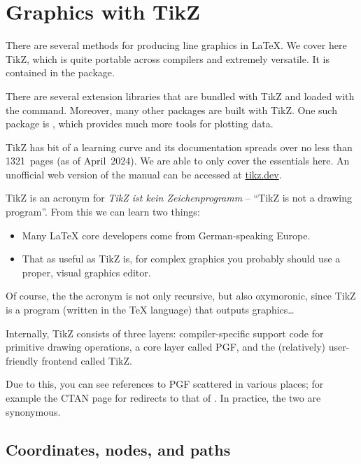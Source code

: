 \chapter{Graphics with TikZ}

There are several methods for producing line graphics in \LaTeX.
We cover here TikZ, which is quite portable across compilers and extremely versatile.
It is contained in the  package.

There are several extension libraries that are bundled with TikZ and loaded with the  command.
Moreover, many other packages are built with TikZ.
One such package is , which provides much more tools for plotting data.

TikZ has bit of a learning curve
and its documentation spreads over no less than 1321~pages (as of April~2024).
We are able to only cover the essentials here.
An unofficial web version of the manual can be accessed at \url{tikz.dev}.

\begin{technote}
TikZ is an acronym for \emph{TikZ ist kein Zeichenprogramm}
-- ``TikZ is not a drawing program''.
From this we can learn two things:
\begin{itemize}
\item Many \LaTeX{} core developers come from German-speaking Europe.
\item That as useful as TikZ is,
    for complex graphics you probably should use a proper, visual graphics editor.
\end{itemize}
Of course, the the acronym is not only recursive,
but also oxymoronic, since TikZ is a program (written in the \TeX{} language)
that outputs graphics\dots
\end{technote}

\begin{technote}
Internally, TikZ consists of three layers:
compiler-specific support code for primitive drawing operations,
a core layer called PGF,
and the (relatively) user-friendly frontend called TikZ.

Due to this, you can see references to PGF scattered in various places;
for example the CTAN page for  redirects to that of .
In practice, the two are synonymous.
\end{technote}


%
%
\section{Coordinates, nodes, and paths}

